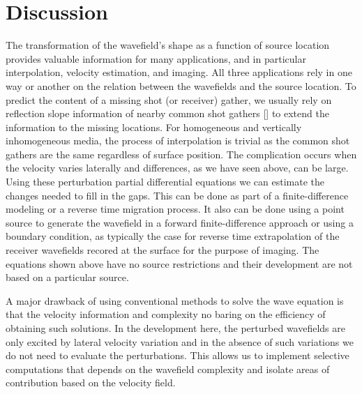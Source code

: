 \section{Discussion}

The transformation of the wavefield's shape as a function of source location provides valuable information for many applications, and in particular interpolation,
velocity estimation, and imaging. All three applications rely in one way or another on the relation between the wavefields and 
the source location. To predict the content of a missing 
shot (or receiver) gather, we usually rely on reflection slope information of nearby common shot gathers [\cite{GEO67-06-19461960}] to extend 
the information to the missing locations. 
For homogeneous and vertically inhomogeneous
media, the process of interpolation is trivial as the common shot gathers are the same 
regardless of surface position. The complication occurs when the velocity varies laterally and
 differences, as we have seen above, can be large. Using these perturbation partial differential equations we can estimate
the changes needed to fill in the gaps. This can be done as part of a finite-difference modeling or a reverse time migration process. 
It also can be done using a point source to generate 
the wavefield in a forward finite-difference approach or using a boundary condition, as typically the case for reverse time extrapolation of the receiver wavefields recored at the surface for the purpose of imaging. 
The equations shown above have no source restrictions and their development are not based on a particular source.

A major drawback of using conventional methods to solve the wave equation is that  the velocity information and complexity    no baring
on the efficiency of obtaining such solutions. In the development here, the perturbed wavefields are only excited by lateral velocity variation and
in the absence of such variations we do not need to evaluate the perturbations. This allows us to implement selective computations that depends on the wavefield
complexity and isolate areas of contribution based on the velocity field.

